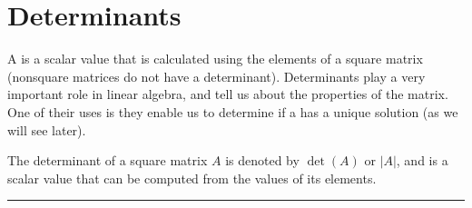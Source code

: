 \documentclass[letterpaper,10pt,english]{jupyterBook}
\begin{document}
\sphinxstepscope

\ignorespaces 
{}\ignorespaces 

\section{Determinants}
\label{\detokenize{_pages/1.4_Determinants:determinants}}\label{\detokenize{_pages/1.4_Determinants:index-1}}\label{\detokenize{_pages/1.4_Determinants:index-0}}\label{\detokenize{_pages/1.4_Determinants:determinant-section}}\label{\detokenize{_pages/1.4_Determinants::doc}}
\sphinxAtStartPar
A  is a scalar value that is calculated using the elements of a square matrix (non\sphinxhyphen{}square matrices do not have a determinant).  Determinants play a very important role in linear algebra, and tell us about the properties of the matrix. One of their uses is they enable us to determine if a {\hyperref[\detokenize{_pages/2.0_Linear_systems:systems-of-linear-equations-chapter}]{}} has a unique solution (as we will see later).

\sphinxAtStartPar
The determinant of a square matrix \(A\) is denoted by \(\det(A)\) or \(|A|\), and is a scalar value that can be computed from the values of its elements.

\ignorespaces 

\bigskip\hrule\bigskip
\end{document}
